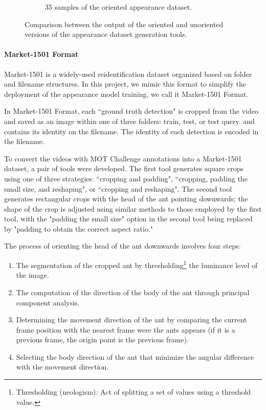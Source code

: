 \begin{figure}[!htp]
\begin{subfigure}[b]{0.4\linewidth}
        \caption[Samples of the oriented appearance dataset]{\footnotesize{35 samples of the oriented appearance dataset.}}
        \label{fig:oriented appearance}
    \end{subfigure}
    \caption[Samples of the appearance datasets]{\footnotesize{Comparison between the output of the oriented and unoriented versions of the appearance dataset generation tools.}}
    \label{fig:appearance dataset}
    \vspace{-1.5em}
\end{figure}

\paragraph{Market-1501 Format}

{
    Market-1501 is a widely-used reidentification dataset organized based on folder and filename structures. 
    In this project, we mimic this format to simplify the deployment of the appearance model training, we call it Market-1501 Format.
}

{
    In Market-1501 Format, each ``ground truth detection" is cropped from the video and saved as an image within one of three folders: train, test, or test query. 
    and contains its identity on the filename. The identity of each detection is encoded in the filename.
}

{
    To convert the videos with MOT Challenge annotations into a Market-1501 dataset, a pair of tools were developed. 
    The first tool generates square crops using one of three strategies: 
    ``cropping and padding", ``cropping, padding the small size, and reshaping", or ``cropping and reshaping".
    The second tool generates rectangular crops with the head of the ant pointing downwards; 
    the shape of the crop is adjusted using similar methods to those employed by the first tool, 
    with the "padding the small size" option in the second tool being replaced by "padding to obtain the correct aspect ratio."
}

{
    The process of orienting the head of the ant downwards involves four steps:
}

\enlargethispage{1.5\baselineskip}

\begin{enumerate}
    \item The segmentation of the cropped ant by thresholding\footnote{Thresholding (neologism): Act of splitting a set of values using a threshold value.} the luminance level of the image.
    \item The computation of the direction of the body of the ant through principal component analysis.
    \item Determining the movement direction of the ant by comparing the current frame position with the nearest frame were the ants appears (if it is a previous frame, the origin point is the previous frame).
    \item Selecting the body direction of the ant that minimize the angular difference with the movement direction.
\end{enumerate}

